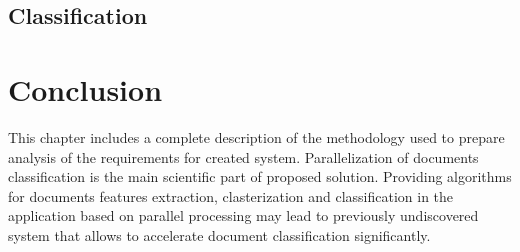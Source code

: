 \subsection{Classification}
\section{Conclusion}
This chapter includes a complete description of the methodology used to prepare analysis of the requirements for created system. Parallelization of documents classification is the main scientific part of proposed solution. Providing algorithms for documents features extraction, clasterization and classification in the application based on parallel processing may lead to previously undiscovered system that allows to accelerate document classification significantly. 